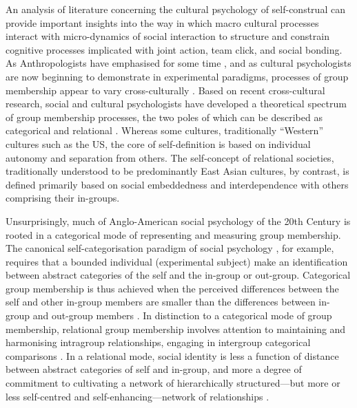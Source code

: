 {  An analysis of literature concerning the cultural psychology of self-construal can provide important insights into the way in which macro cultural processes interact with micro-dynamics of social interaction to structure and constrain cognitive processes implicated with joint action, team click, and social bonding.  As Anthropologists have emphasised for some time \citep{Strodtbeck1961,Kluckhohn1961,Mead1967,Fei1992}, and as cultural psychologists are now beginning to demonstrate in experimental paradigms, processes of group membership appear to vary cross-culturally \citep{Markus1991,Nisbett2001}.  Based on recent cross-cultural research, social and cultural psychologists have developed a theoretical spectrum of group membership processes, the two poles of which can be described as categorical and relational \citep{Hofstede1980,Brewer2007}.  Whereas some cultures, traditionally ``Western'' cultures such as the US, the core of self-definition is based on individual autonomy and separation from others.
  The self-concept of relational societies, traditionally understood to be predominantly East Asian cultures, by contrast, is defined primarily based on social embeddedness and interdependence with others comprising their in-groups\citep{Leung2012}.

  Unsurprisingly, much of Anglo-American social psychology of the 20th Century is rooted in a categorical mode of representing and measuring group membership.  The canonical self-categorisation paradigm of social psychology \citep{Turner1987}, for example, requires that a bounded individual (experimental subject) make an identification between abstract categories of the self and the in-group or out-group.  Categorical group membership is thus achieved when the perceived differences between the self and other in-group members are smaller than the differences between in-group and out-group members \citep{Yuki2014}.  In distinction to a categorical mode of group membership, relational group membership involves attention to maintaining and harmonising intragroup relationships, engaging in intergroup categorical comparisons \citep{Yuki2003}.
  In a relational mode, social identity is less a function of distance between abstract categories of self and in-group, and more a degree of commitment to cultivating a network of hierarchically structured---but more or less self-centred and self-enhancing---network of relationships \citep{Liu2009,Nisbett2003}.

}
